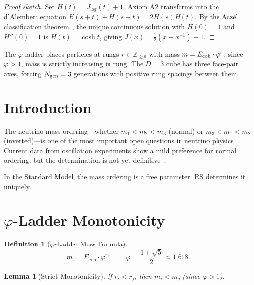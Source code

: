 \documentclass[12pt,a4paper]{article}
\newtheorem{lemma}[theorem]{Lemma}
\theoremstyle{definition}
\newtheorem{definition}[theorem]{Definition}
\theoremstyle{remark}
\begin{document}
\begin{proof}[Proof sketch]
Set $H(t) = J_{\log}(t)+1$.  Axiom A2 transforms into the d'Alembert
equation $H(s+t)+H(s-t)=2H(s)H(t)$.  By the Acz\'el classification
theorem~\cite{Aczel1966}, the unique continuous solution with $H(0)=1$
and $H''(0)=1$ is $H(t)=\cosh t$, giving
$J(x)=\tfrac{1}{2}(x+x^{-1})-1$.
\end{proof}

\noindent The $\varphi$-ladder places particles at rungs
$r \in \mathbb{Z}_{\geq 0}$ with mass $m = E_{\rm coh}\cdot\varphi^r$;
since $\varphi > 1$, mass is strictly increasing in rung.  The
$D = 3$ cube has three face-pair axes, forcing $N_{\rm gen} = 3$
generations with positive rung spacings between them.

\section{Introduction}
\label{sec:intro}

The neutrino mass ordering---whether $m_1 < m_2 < m_3$ (normal)
or $m_3 < m_1 < m_2$ (inverted)---is one of the most important
open questions in neutrino physics~\cite{PDG2024}.  Current data
from oscillation experiments show a mild preference for normal
ordering, but the determination is not yet
definitive~\cite{Capozzi2021}.

In the Standard Model, the mass ordering is a free parameter.
RS determines it uniquely.

\section{$\varphi$-Ladder Monotonicity}
\label{sec:mono}

\begin{definition}[$\varphi$-Ladder Mass Formula]
\begin{equation}
  m_i = E_{\mathrm{coh}} \cdot \varphi^{r_i},
  \qquad \varphi = \frac{1 + \sqrt{5}}{2} \approx 1.618.
\end{equation}
\end{definition}

\begin{lemma}[Strict Monotonicity]
\label{lem:mono}
If $r_i < r_j$, then $m_i < m_j$ (since $\varphi > 1$).
\end{lemma}
\end{document}
